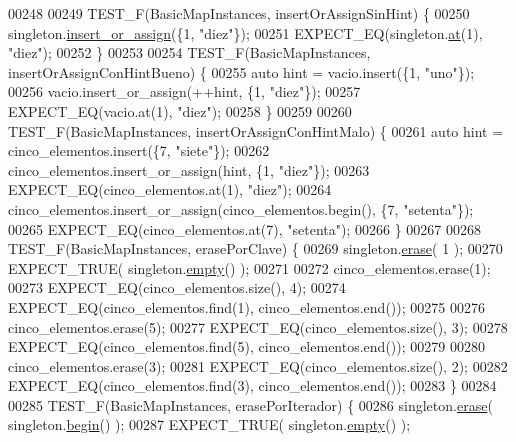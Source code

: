 \begin{DoxyCode}
00248 
00249 TEST\_F(BasicMapInstances, insertOrAssignSinHint) \{
00250     singleton.\hyperlink{classaed2_1_1map_a2ef6723c183916276b0afc4a4c721475_a2ef6723c183916276b0afc4a4c721475}{insert_or_assign}(\{1, \textcolor{stringliteral}{"diez"}\});
00251     EXPECT\_EQ(singleton.\hyperlink{classaed2_1_1map_a0b0a11f906da2926f9eb342fcee79fd7_a0b0a11f906da2926f9eb342fcee79fd7}{at}(1), \textcolor{stringliteral}{"diez"});
00252 \}
00253 
00254 TEST\_F(BasicMapInstances, insertOrAssignConHintBueno) \{
00255     \textcolor{keyword}{auto} hint = vacio.insert(\{1, \textcolor{stringliteral}{"uno"}\});
00256     vacio.insert\_or\_assign(++hint, \{1, \textcolor{stringliteral}{"diez"}\});
00257     EXPECT\_EQ(vacio.at(1), \textcolor{stringliteral}{"diez"});
00258 \}
00259 
00260 TEST\_F(BasicMapInstances, insertOrAssignConHintMalo) \{
00261     \textcolor{keyword}{auto} hint = cinco\_elementos.insert(\{7, \textcolor{stringliteral}{"siete"}\});
00262     cinco\_elementos.insert\_or\_assign(hint, \{1, \textcolor{stringliteral}{"diez"}\});
00263     EXPECT\_EQ(cinco\_elementos.at(1), \textcolor{stringliteral}{"diez"});
00264     cinco\_elementos.insert\_or\_assign(cinco\_elementos.begin(), \{7, \textcolor{stringliteral}{"setenta"}\});
00265     EXPECT\_EQ(cinco\_elementos.at(7), \textcolor{stringliteral}{"setenta"});
00266 \}
00267 
00268 TEST\_F(BasicMapInstances, erasePorClave) \{
00269     singleton.\hyperlink{classaed2_1_1map_ad8e796bf9c9c558e5ce6b61e116253fe_ad8e796bf9c9c558e5ce6b61e116253fe}{erase}( 1 );
00270     EXPECT\_TRUE( singleton.\hyperlink{classaed2_1_1map_af5320ca0a7df4d16015441d5d055a7ee_af5320ca0a7df4d16015441d5d055a7ee}{empty}() );
00271 
00272     cinco\_elementos.erase(1);
00273     EXPECT\_EQ(cinco\_elementos.size(), 4);
00274     EXPECT\_EQ(cinco\_elementos.find(1), cinco\_elementos.end());
00275 
00276     cinco\_elementos.erase(5);
00277     EXPECT\_EQ(cinco\_elementos.size(), 3);
00278     EXPECT\_EQ(cinco\_elementos.find(5), cinco\_elementos.end());
00279 
00280     cinco\_elementos.erase(3);
00281     EXPECT\_EQ(cinco\_elementos.size(), 2);
00282     EXPECT\_EQ(cinco\_elementos.find(3), cinco\_elementos.end());
00283 \}
00284 
00285 TEST\_F(BasicMapInstances, erasePorIterador) \{
00286     singleton.\hyperlink{classaed2_1_1map_ad8e796bf9c9c558e5ce6b61e116253fe_ad8e796bf9c9c558e5ce6b61e116253fe}{erase}( singleton.\hyperlink{classaed2_1_1map_a58a95705d54b3dda7f775ce5a22225cb_a58a95705d54b3dda7f775ce5a22225cb}{begin}() );
00287     EXPECT\_TRUE( singleton.\hyperlink{classaed2_1_1map_af5320ca0a7df4d16015441d5d055a7ee_af5320ca0a7df4d16015441d5d055a7ee}{empty}() );

\end{DoxyCode}
